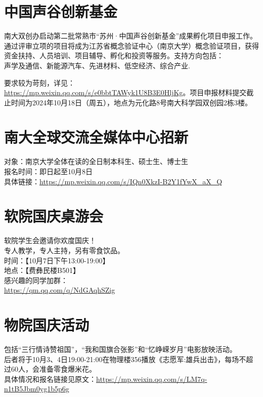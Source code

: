 \documentclass[letterpaper, 12pt]{article}
\begin{document}
\begin{multicols}{2}
\section{中国声谷创新基金}
南大双创办启动第二批常熟市“苏州·中国声谷创新基金”成果孵化项目申报工作。通过评审立项的项目将成为江苏省概念验证中心（南京大学）概念验证项目，获得资金扶持、人员培训、项目辅导、孵化和投资等服务。支持方向包括：\\

声学及通信、新能源汽车、先进材料、低空经济、综合产业.

要求较为苛刻，详见：\url{https://mp.weixin.qq.com/s/e0bbtTAWyk1U8B3E0HljKg}。项目申报材料提交截止时间为2024年10月18日（周五），地点为元化路8号南大科学园双创园2栋3楼。
\section{南大全球交流全媒体中心招新}
对象：南京大学全体在读的全日制本科生、硕士生、博士生\\
报名时间：即日起至10月8日\\
具体链接：\url{https://mp.weixin.qq.com/s/IQn0XkzI-B2Y1fYwX_aX_Q}
\section{软院国庆桌游会}
软院学生会邀请你欢度国庆！\\
专人教学，专人主持，另有零食饮品。\\
时间：【10月7日下午13:00-19:00】\\ 
地点：【费彝民楼B501】\\
感兴趣的同学加群：\\
\url{https://qm.qq.com/q/NdGAqhSZig}

\section{物院国庆活动}
包括“三行情诗赞祖国”，“我和国旗合张影”和“忆峥嵘岁月”电影放映活动。\\
后者将于10月3、4日19:00-21:00在物理楼356播放《志愿军:雄兵出击》，每场不超过60人，会准备零食爆米花。\\
具体情况和报名链接见原文：\url{https://mp.weixin.qq.com/s/LM7q-n1tB5Jbm0yg1b5p6g}


\end{multicols}
\end{document}
